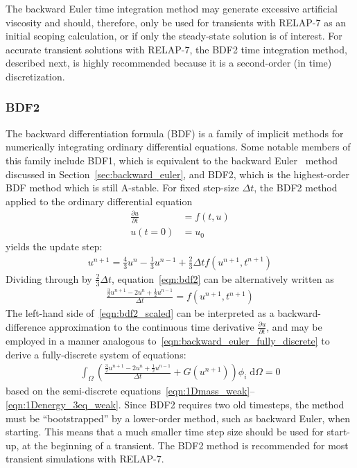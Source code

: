 The backward Euler time integration method may generate excessive artificial
viscosity and should, therefore, only be used for transients with RELAP-7
as an initial scoping calculation, or if only the steady-state solution is of
interest. For accurate transient solutions with RELAP-7, the BDF2 time
integration method, described next, is highly recommended because it is
a second-order (in time) discretization.
%
\subsubsection{BDF2\label{sec:bdf2}}
%
The backward differentiation formula (BDF) is a family of implicit
methods for numerically integrating ordinary differential equations.
Some notable members of this family include BDF1, which is equivalent
to the backward Euler~\cite{Ascher_1998} method discussed in
Section~\ref{sec:backward_euler}, and BDF2, which is the highest-order
BDF method which is still A-stable.  For fixed step-size $\Delta t$, the BDF2 method 
applied to the ordinary differential equation
\begin{align}
  \frac{\partial u}{\partial t} &= f(t, u)
  \\
  u(t=0) &= u_0
\end{align}
yields the update step:
\begin{align}
\label{eqn:bdf2}
u^{n+1} = \frac{4}{3}u^n - \frac{1}{3}u^{n-1} + \frac{2}{3} \Delta t f(u^{n+1}, t^{n+1})
\end{align}
Dividing through by $\frac{2}{3} \Delta t$, equation~\eqref{eqn:bdf2} can be 
alternatively written as
\begin{align}
\label{eqn:bdf2_scaled}
\frac{\frac{3}{2}u^{n+1} - 2u^n  + \frac{1}{2}u^{n-1}}{\Delta t} = f(u^{n+1}, t^{n+1})
\end{align}
The left-hand side of~\eqref{eqn:bdf2_scaled} can be interpreted as a
backward-difference approximation to the continuous time derivative
$\frac{\partial u}{\partial t}$, and may be employed in a manner analogous
to~\eqref{eqn:backward_euler_fully_discrete} to derive a fully-discrete
system of equations:
\begin{align}
  \label{eqn:bdf2_fully_discrete}
  \int_{\Omega} \left( \frac{\frac{3}{2}u^{n+1} - 2u^n  + \frac{1}{2}u^{n-1}}{\Delta t} + G(u^{n+1}) \right) \phi_i \; \text{d}{\Omega} = 0
\end{align}
based on the semi-discrete equations~\eqref{eqn:1Dmass_weak}--\eqref{eqn:1Denergy_3eq_weak}.
Since BDF2 requires two old timesteps, the method must be
``bootstrapped'' by a lower-order method, such as backward Euler, when
starting.  This means that a much smaller time step size should be used
for start-up, at the beginning of a transient.  The BDF2 method is 
recommended for most transient simulations with RELAP-7.
%
